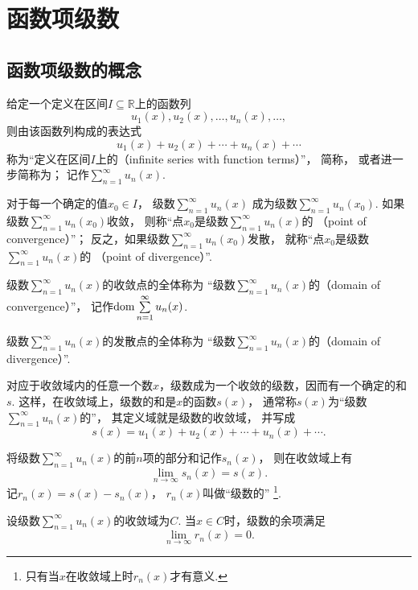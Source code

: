 \section{函数项级数}
\subsection{函数项级数的概念}
\begin{definition}\label{definition:无穷级数.实函数项级数的概念}
给定一个定义在区间\(I \subseteq \mathbb{R}\)上的函数列\[
	u_1(x),u_2(x),\dotsc,u_n(x),\dotsc,
\]
则由该函数列构成的表达式\[
	u_1(x)+u_2(x)+\dotsb+u_n(x)+\dotsb
\]
称为“定义在区间\(I\)上的（infinite series with function terms）”，
简称，
或者进一步简称为；
记作\(\sum\limits_{n=1}^\infty u_n(x)\).

对于每一个确定的值\(x_0 \in I\)，
级数\(\sum\limits_{n=1}^\infty u_n(x)\)
成为级数\(\sum\limits_{n=1}^\infty u_n(x_0)\).
如果级数\(\sum\limits_{n=1}^\infty u_n(x_0)\)收敛，
则称“点\(x_0\)是级数\(\sum\limits_{n=1}^\infty u_n(x)\)的
（point of convergence）”；
反之，如果级数\(\sum\limits_{n=1}^\infty u_n(x_0)\)发散，
就称“点\(x_0\)是级数\(\sum\limits_{n=1}^\infty u_n(x)\)的
（point of divergence）”.

级数\(\sum\limits_{n=1}^\infty u_n(x)\)的收敛点的全体称为
“级数\(\sum\limits_{n=1}^\infty u_n(x)\)的（domain of convergence）”，
记作\(\operatorname{dom} \sum\limits_{n=1}^\infty u_n(x)\).

级数\(\sum\limits_{n=1}^\infty u_n(x)\)的发散点的全体称为
“级数\(\sum\limits_{n=1}^\infty u_n(x)\)的（domain of divergence）”.

对应于收敛域内的任意一个数\(x\)，级数成为一个收敛的级数，因而有一个确定的和\(s\).
这样，在收敛域上，级数的和是\(x\)的函数\(s(x)\)，
通常称\(s(x)\)为“级数\(\sum\limits_{n=1}^\infty u_n(x)\)的”，
其定义域就是级数的收敛域，
并写成\[
	s(x) = u_1(x)+u_2(x)+\dotsb+u_n(x)+\dotsb.
\]

将级数\(\sum\limits_{n=1}^\infty u_n(x)\)的前\(n\)项的部分和记作\(s_n(x)\)，
则在收敛域上有\[
	\lim\limits_{n\to\infty} s_n(x) = s(x).
\]
记\(r_n(x) = s(x)-s_n(x)\)，
\(r_n(x)\)叫做“级数的”%
\footnote{只有当\(x\)在收敛域上时\(r_n(x)\)才有意义.}.
\end{definition}

\begin{property}
设级数\(\sum\limits_{n=1}^\infty u_n(x)\)的收敛域为\(C\).
当\(x \in C\)时，级数的余项满足\[
	\lim\limits_{n\to\infty} r_n(x) = 0.
\]
\end{property}
